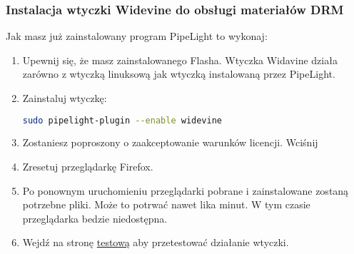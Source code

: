 \subsubsection{Instalacja wtyczki Widevine do obsługi materiałów DRM}
\noindent Jak masz już zainstalowany program PipeLight to wykonaj:
\begin{enumerate}
\item Upewnij się, że masz zainstalowanego Flasha. Wtyczka Widavine działa zarówno z wtyczką linuksową jak wtyczką instalowaną przez PipeLight.
\item Zainstaluj wtyczkę:
\begin{lstlisting}[language=bash]
sudo pipelight-plugin --enable widevine
\end{lstlisting}
\item Zostaniesz poproszony o zaakceptowanie warunków licencji. Wciśnij 
\item Zresetuj przeglądarkę Firefox.
\item Po ponownym uruchomieniu przeglądarki pobrane i zainstalowane zostaną potrzebne pliki. Może to potrwać nawet lika minut. W tym czasie przeglądarka bedzie niedostępna.
\item Wejdź na stronę \href{http://www.widevine.com/demo/index.html}{testową} aby przetestować działanie wtyczki.
\end{enumerate}

